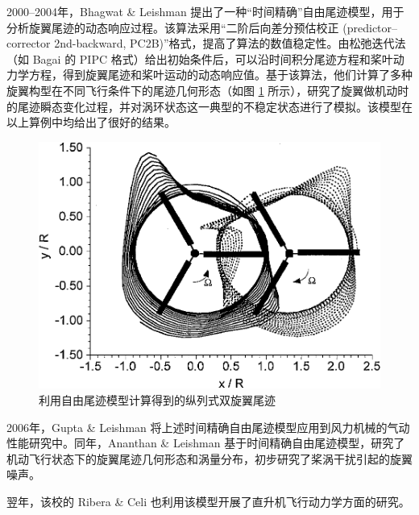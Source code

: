 2000–2004年，Bhagwat \& Leishman
提出了一种“时间精确”自由尾迹模型，用于分析旋翼尾迹的动态响应过程。该算法采用“二阶后向差分预估校正 (predictor–corrector
2nd-backward, PC2B)”格式，提高了算法的数值稳定性。由松弛迭代法（如 Bagai 的 PIPC 格式）给出初始条件后，可以沿时间积分尾迹方程和桨叶动力学方程，得到旋翼尾迹和桨叶运动的动态响应值。基于该算法，他们计算了多种旋翼构型在不同飞行条件下的尾迹几何形态（如图
\ref{fig:free-wake} 所示），研究了旋翼做机动时的尾迹瞬态变化过程，并对涡环状态这一典型的不稳定状态进行了模拟。该模型在以上算例中均给出了很好的结果。
\begin{figure}[h!]
\centering{}\includegraphics[width=1\textwidth,height=0.26\textheight,keepaspectratio]{../review/figures/free-wake}
\caption{\label{fig:free-wake}利用自由尾迹模型计算得到的纵列式双旋翼尾迹}
\end{figure}

2006年，Gupta \& Leishman 将上述时间精确自由尾迹模型应用到风力机械的气动性能研究中。同年，Ananthan
\& Leishman 基于时间精确自由尾迹模型，研究了机动飞行状态下的旋翼尾迹几何形态和涡量分布，初步研究了桨涡干扰引起的旋翼噪声。

翌年，该校的 Ribera \& Celi 也利用该模型开展了直升机飞行动力学方面的研究。

\newpage{}

